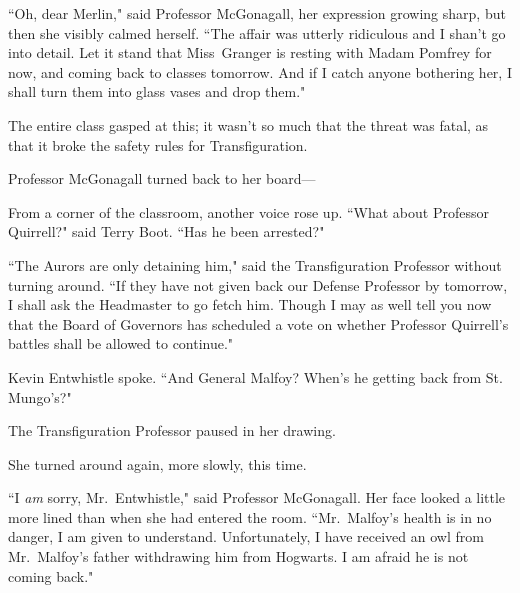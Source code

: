 ``Oh, dear Merlin," said Professor McGonagall, her expression growing sharp, but then she visibly calmed herself. ``The affair was utterly ridiculous and I shan't go into detail. Let it stand that Miss~Granger is resting with Madam Pomfrey for now, and coming back to classes tomorrow. And if I catch anyone bothering her, I shall turn them into glass vases and drop them."

The entire class gasped at this; it wasn't so much that the threat was fatal, as that it broke the safety rules for Transfiguration.

Professor McGonagall turned back to her board—

From a corner of the classroom, another voice rose up. ``What about Professor Quirrell?" said Terry Boot. ``Has he been arrested?"

``The Aurors are only detaining him," said the Transfiguration Professor without turning around. ``If they have not given back our Defense Professor by tomorrow, I shall ask the Headmaster to go fetch him. Though I may as well tell you now that the Board of Governors has scheduled a vote on whether Professor Quirrell's battles shall be allowed to continue."

Kevin Entwhistle spoke. ``And General Malfoy? When's he getting back from St. Mungo's?"

The Transfiguration Professor paused in her drawing.

She turned around again, more slowly, this time.

``I \emph{am} sorry, Mr.~Entwhistle," said Professor McGonagall. Her face looked a little more lined than when she had entered the room. ``Mr.~Malfoy's health is in no danger, I am given to understand. Unfortunately, I have received an owl from Mr.~Malfoy's father withdrawing him from Hogwarts. I am afraid he is not coming back."

